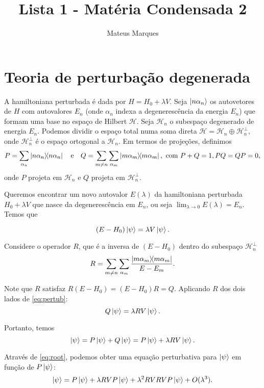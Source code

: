 \documentclass[a4paper,10pt]{article}
\title{\Huge{\textbf{Lista 1 - Matéria Condensada 2}}}
\author{Mateus Marques}
\begin{document}
\maketitle


\section{Teoria de perturbação degenerada}

A hamiltoniana perturbada é dada por $H = H_0 + \lambda V$. Seja $\ket{n \alpha_n}$ os autovetores de $H$ com autovalores $E_n$ (onde $\alpha_n$ indexa a degenerescência da energia $E_n$) que formam uma base no espaço de Hilbert $\mathcal{H}$. Seja $\mathcal{H}_n$ o subespaço degenerado de energia $E_n$. Podemos dividir o espaço total numa soma direta $\mathcal{H} = \mathcal{H}_n \oplus \mathcal{H}_n^\perp$, onde $\mathcal{H}_n^\perp$ é o espaço ortogonal a $\mathcal{H}_n$. Em termos de projeções, definimos
$$
P = \sum_{\alpha_n} \ketbra{n \alpha_n} \quad \mathrm{e} \quad
Q = \sum_{m \neq n} \sum_{\alpha_m} \ketbra{m \alpha_m}, \text{ com }
P + Q = 1, PQ = QP = 0,
$$
onde $P$ projeta em $\mathcal{H}_n$ e $Q$ projeta em $\mathcal{H}_n^\perp$.

Queremos encontrar um novo autovalor $E(\lambda)$ da hamiltoniana perturbada $H_0 + \lambda V$ que nasce da degenerescência em $E_n$, ou seja $\displaystyle{\lim_{\lambda \to 0} E(\lambda) = E_n}$. Temos que

\begin{equation} \label{eq:pertub}
(E - H_0) \ket{\psi} = \lambda V \ket{\psi}.
\end{equation}

Considere o operador $R$, que é a inversa de $(E - H_0)$ dentro do subespaço $\mathcal{H}_n^\perp$
$$
R = \sum_{m \neq n} \sum_{\alpha_m} \frac{\ketbra{m \alpha_m}}{E - E_m}.
$$

Note que $R$ satisfaz $R (E - H_0) = (E - H_0) R = Q$. Aplicando $R$ dos dois lados de \ref{eq:pertub}:
$$
Q \ket{\psi} = \lambda R V \ket{\psi}.
$$

Portanto, temos
\begin{equation} \label{eq:root}
\ket{\psi} = P \ket{\psi} + Q \ket{\psi} =
P \ket{\psi} + \lambda R V \ket{\psi}.
\end{equation}

Através de \ref{eq:root}, podemos obter uma equação perturbativa para $\ket{\psi}$ em função de $P \ket{\psi}$:
\begin{equation} \label{eq:recorr}
\ket{\psi} = P \ket{\psi} + \lambda R V P \ket{\psi} + \lambda^2 R V R V P \ket{\psi} + O(\lambda^3).
\end{equation}
\end{document}
